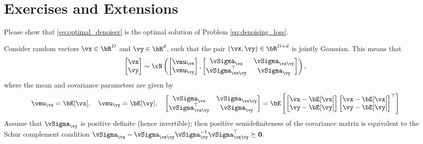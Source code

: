 \documentclass[../../book-main.tex]{subfiles}
\begin{document}




\section{Exercises and Extensions}

\begin{exercise}
    Please show that \eqref{eq:optimal_denoiser} is the optimal solution of Problem \eqref{eq:denoising_loss}. 
\end{exercise}

\begin{exercise}\label{exercise:conditional_gaussian}
  Consider random vectors $\vx \in \bR^D$ and $\vy \in \bR^d$, such that the
  pair $(\vx, \vy) \in \bR^{D + d}$ is jointly Gaussian. This means that
  \begin{equation*}
    \begin{bmatrix}
      \vx \\
      \vy
    \end{bmatrix}
    \sim
    \cN \left(
      \begin{bmatrix}
        \vmu_{\vx} \\
        \vmu_{\vy}
      \end{bmatrix}
      ,
      \begin{bmatrix}
        \vSigma_{\vx} & \vSigma_{\vx\vy} \\
        \vSigma_{\vx\vy}^\top & \vSigma_{\vy}
      \end{bmatrix}
    \right),
  \end{equation*}
  where the mean and covariance parameters are given by
  \begin{equation*}
    \vmu_{\vx} = \bE[\vx],\quad \vmu_{\vy} = \bE[\vy],\quad
    \begin{bmatrix}
      \vSigma_{\vx} & \vSigma_{\vx\vy} \\
      \vSigma_{\vx\vy}^\top & \vSigma_{\vy}
    \end{bmatrix}
    =
    \bE\left[
      \begin{bmatrix}
        \vx - \bE[\vx] \\
        \vy - \bE[\vy]
      \end{bmatrix}
      \begin{bmatrix}
        \vx - \bE[\vx] \\
        \vy - \bE[\vy]
      \end{bmatrix}^\top
      \right]
  \end{equation*}
  Assume that $\vSigma_{\vy}$ is positive definite (hence invertible); then
  positive semidefiniteness of the covariance matrix is equivalent to the Schur
  complement condition $\vSigma_{\vx} - \vSigma_{\vx\vy} \vSigma_{\vy}^{-1}
  \vSigma_{\vx\vy}^\top \succeq \Zero$.


\end{exercise}
\end{document}
